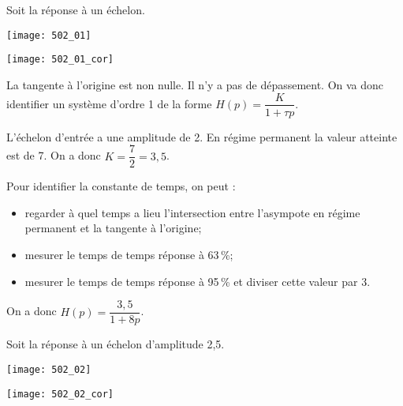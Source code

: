 \normaltrue \difficilefalse \tdifficilefalse
\correctiontrue


\setcounter{question}{0}%
\ifcorrection
\else
{}
\fi


\ifprof 
\else
Soit la réponse à un échelon.
\begin{marginfigure}
\texttt{[image: 502\_01]}
\end{marginfigure}
\fi

\ifprof
\begin{marginfigure}
\texttt{[image: 502\_01\_cor]}
\end{marginfigure}

La tangente à l'origine est non nulle. Il n'y a pas de dépassement. On va donc identifier un système d'ordre 1 de la forme $H(p)=\dfrac{K}{1+\tau p}$.

L'échelon d'entrée a une amplitude de 2. En régime permanent la valeur atteinte est de 7. On a donc $K = \dfrac{7}{2}=3,5$.

Pour identifier la constante de temps, on peut : 
\begin{itemize}
\item regarder à quel temps a lieu l'intersection entre l'asympote en régime permanent et la tangente à l'origine;

\item mesurer le temps de temps réponse à 63\,\%;

\item mesurer le temps de temps réponse à 95\,\% et diviser cette valeur par 3.
\end{itemize}

On a donc $H(p)=\dfrac{3,5}{1+8p}$.
\else
\fi



\ifprof 
\else
Soit la réponse à un échelon d'amplitude 2,5.

\begin{marginfigure}
\texttt{[image: 502\_02]}
\end{marginfigure}
\fi

\ifprof
\begin{marginfigure}
\texttt{[image: 502\_02\_cor]}
\end{marginfigure}

